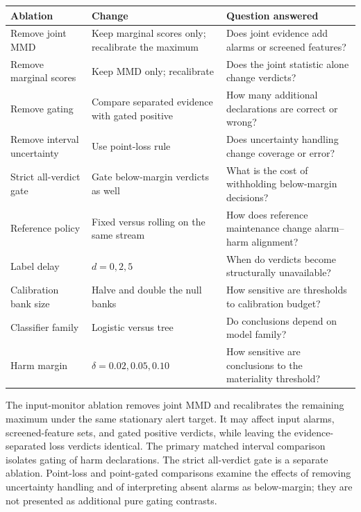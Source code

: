 \documentclass[
]{article}
\begin{document}
\begin{longtable}[]{@{}
  >{\raggedright\arraybackslash}p{}
  >{\raggedright\arraybackslash}p{}
  >{\raggedright\arraybackslash}p{}@{}}
\toprule
Ablation & Change & Question answered \\
\midrule
\endhead
Remove joint MMD & Keep marginal scores only; recalibrate the maximum &
Does joint evidence add alarms or screened features? \\
Remove marginal scores & Keep MMD only; recalibrate & Does the joint
statistic alone change verdicts? \\
Remove gating & Compare separated evidence with gated positive & How
many additional declarations are correct or wrong? \\
Remove interval uncertainty & Use point-loss rule & Does uncertainty
handling change coverage or error? \\
Strict all-verdict gate & Gate below-margin verdicts as well & What is
the cost of withholding below-margin decisions? \\
Reference policy & Fixed versus rolling on the same stream & How does
reference maintenance change alarm--harm alignment? \\
Label delay & \(d=0,2,5\) & When do verdicts become structurally
unavailable? \\
Calibration bank size & Halve and double the null banks & How sensitive
are thresholds to calibration budget? \\
Classifier family & Logistic versus tree & Do conclusions depend on
model family? \\
Harm margin & \(\delta=0.02,0.05,0.10\) & How sensitive are conclusions
to the materiality threshold? \\
\bottomrule
\end{longtable}

The input-monitor ablation removes joint MMD and recalibrates the
remaining maximum under the same stationary alert target. It may affect
input alarms, screened-feature sets, and gated positive verdicts, while
leaving the evidence-separated loss verdicts identical. The primary
matched interval comparison isolates gating of harm declarations. The
strict all-verdict gate is a separate ablation. Point-loss and
point-gated comparisons examine the effects of removing uncertainty
handling and of interpreting absent alarms as below-margin; they are not
presented as additional pure gating contrasts.
\end{document}
